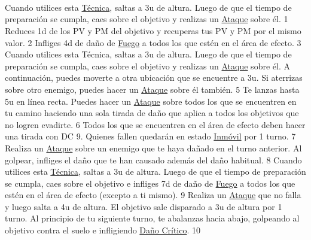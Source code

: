 \pagebreak \\
\\\\
 { Cuando utilices esta \hyperlink{action}{Técnica}, saltas a 3u de altura. Luego de que el tiempo de preparación se cumpla, caes sobre el objetivo y realizas un \hyperlink{action}{Ataque} sobre él. }{}{1}  { Reduces 1d de los PV y PM del objetivo y recuperas tus PV y PM por el mismo valor. }{}{2}  { Infliges 4d de daño de \hyperlink{type}{Fuego} a todos los que estén en el área de efecto. }{\fire}{3}  { Cuando utilices esta Técnica, saltas a 3u de altura. Luego de que el tiempo de preparación se cumpla, caes sobre el objetivo y realizas un \hyperlink{action}{Ataque} sobre él. A continuación, puedes moverte a otra ubicación que se encuentre a 3u. Si aterrizas sobre otro enemigo, puedes hacer un \hyperlink{action}{Ataque} sobre él también. }{}{5}  { Te lanzas hasta 5u en línea recta. Puedes hacer un \hyperlink{action}{Ataque} sobre todos los que se encuentren en tu camino haciendo una sola tirada de daño que aplica a todos los objetivos que no logren evadirte. }{}{6}  { Todos los que se encuentren en el área de efecto deben hacer una tirada con DC 9. Quienes fallen quedarán en estado \hyperlink{status}{Inmóvil} por 1 turno. }{\immobile}{7}  { Realiza un \hyperlink{action}{Ataque} sobre un enemigo que te haya dañado en el turno anterior. Al golpear, infliges el daño que te han causado además del daño habitual. }{}{8}  {  Cuando utilices esta \hyperlink{action}{Técnica}, saltas a 3u de altura. Luego de que el tiempo de preparación se cumpla, caes sobre el objetivo e infliges 7d de daño de \hyperlink{type}{Fuego} a todos los que estén en el área de efecto (excepto a ti mismo). }{\fire}{9}  { Realiza un \hyperlink{action}{Ataque} que no falla y luego salta a 4u de altura. El objetivo sale disparado a 3u de altura por 1 turno. Al principio de tu siguiente turno, te abalanzas hacia abajo, golpeando al objetivo contra el suelo e infligiendo \hyperlink{action}{Daño Crítico}. }{}{10}
\pagebreak